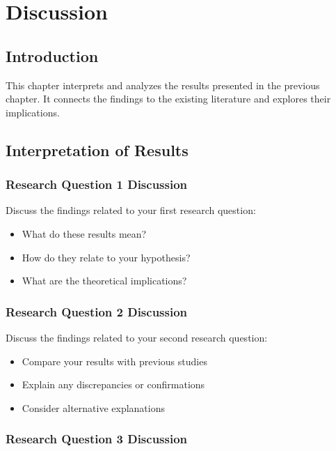 \chapter{Discussion}

\section{Introduction}

This chapter interprets and analyzes the results presented in the previous chapter. It connects the findings to the existing literature and explores their implications.

\section{Interpretation of Results}

\subsection{Research Question 1 Discussion}

Discuss the findings related to your first research question:

\begin{itemize}
    \item What do these results mean?
    \item How do they relate to your hypothesis?
    \item What are the theoretical implications?
\end{itemize}

\subsection{Research Question 2 Discussion}

Discuss the findings related to your second research question:

\begin{itemize}
    \item Compare your results with previous studies
    \item Explain any discrepancies or confirmations
    \item Consider alternative explanations
\end{itemize}

\subsection{Research Question 3 Discussion}

